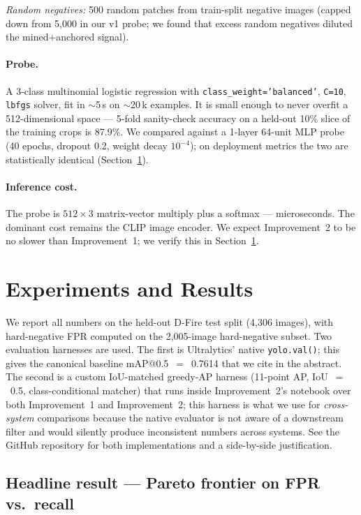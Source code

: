 \documentclass{article}
\begin{document}
\textit{Random negatives:} 500 random patches from train-split negative
images (capped down from 5{,}000 in our v1 probe; we found that excess random
negatives diluted the mined+anchored signal).

\paragraph{Probe.} A 3-class multinomial logistic regression with
\texttt{class\_weight='balanced'}, \texttt{C=10}, \texttt{lbfgs} solver,
fit in $\sim$5\,s on $\sim$20\,k examples. It is small enough to never overfit
a 512-dimensional space --- 5-fold sanity-check accuracy on a held-out 10\%
slice of the training crops is 87.9\%. We compared against a 1-layer
64-unit MLP probe (40 epochs, dropout 0.2, weight decay $10^{-4}$); on
deployment metrics the two are statistically identical
(Section~\ref{sec:results}).

\paragraph{Inference cost.} The probe is $512\times3$ matrix-vector multiply
plus a softmax --- microseconds. The dominant cost remains the CLIP image
encoder. We expect Improvement~2 to be no slower than Improvement~1; we
verify this in Section~\ref{sec:results}.

\section{Experiments and Results}
\label{sec:results}

We report all numbers on the held-out D-Fire test split (4{,}306 images), with
hard-negative FPR computed on the 2{,}005-image hard-negative subset. Two
evaluation harnesses are used. The first is Ultralytics' native
\texttt{yolo.val()}; this gives the canonical baseline mAP@0.5~$=$~0.7614
that we cite in the abstract. The second is a custom IoU-matched
greedy-AP harness (11-point AP, IoU~$=$~0.5, class-conditional matcher) that
runs inside Improvement~2's notebook over both Improvement~1 and Improvement~2;
this harness is what we use for \emph{cross-system} comparisons because the
native evaluator is not aware of a downstream filter and would silently produce
inconsistent numbers across systems. See the GitHub repository for both
implementations and a side-by-side justification.

\subsection{Headline result --- Pareto frontier on FPR vs.\ recall}
\end{document}
